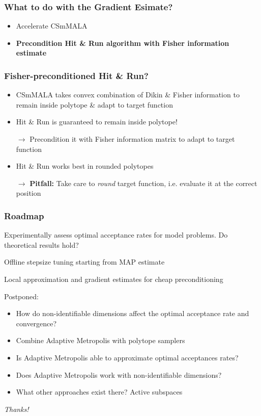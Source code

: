 \begin{frame}[c]
    \frametitle{What to do with the Gradient Esimate?}
    \begin{itemize}
        \item Accelerate CSmMALA
        \item \textbf{Precondition Hit \& Run algorithm with Fisher information estimate}
    \end{itemize}
\end{frame}

\begin{frame}[c]
    \frametitle{Fisher-preconditioned Hit \& Run?}
    \begin{itemize}
        \item CSmMALA takes convex combination of Dikin \& Fisher information to remain inside polytope \& adapt to target function
        \item Hit \& Run is guaranteed to remain inside polytope! 
        \item[$\to$] Precondition it with Fisher information matrix to adapt to target function
        \item[]
        \item Hit \& Run works best in rounded polytopes
        \item[$\to$] \textbf{Pitfall:} Take care to \emph{round} target function, i.e. evaluate it at the correct position
    \end{itemize}
\end{frame}

\begin{frame}[c]
    \frametitle{Roadmap}
    \begin{itemize}
        {\color{lgray}
            \item Experimentally assess optimal acceptance rates for model problems. Do theoretical results hold?
        }
        \item Offline stepsize tuning starting from MAP estimate
        \item Local approximation and gradient estimates for cheap preconditioning
    \end{itemize}
    \bigskip
    Postponed:
    { \tiny
    \begin{itemize}
	\item How do non-identifiable dimensions affect the optimal acceptance rate and convergence?
	\item Combine Adaptive Metropolis with polytope samplers
	\item Is Adaptive Metropolis able to approximate optimal acceptances rates? 
	\item Does Adaptive Metropolis work with non-identifiable dimensions?
	\item What other approaches exist there? Active subspaces \cite{Constantine_2016}
    \end{itemize}
    }
\end{frame}

\begin{frame}[c]{}
    \centering
    \Huge \emph{Thanks!}
\end{frame}

